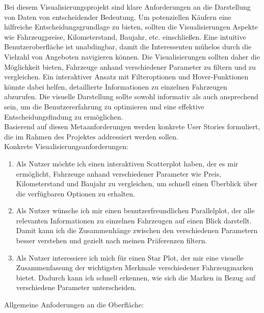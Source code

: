 \documentclass[usegeometry=true]{scrartcl}
\begin{document}
Bei diesem Visualisierungsprojekt sind klare Anforderungen an die Darstellung von Daten von entscheidender Bedeutung. Um potenziellen Käufern eine hilfreiche Entscheidungsgrundlage zu bieten, sollten die Visualisierungen Aspekte wie Fahrzeugpreise, Kilometerstand, Baujahr, etc. einschließen. Eine intuitive Benutzeroberfläche ist unabdingbar, damit die Interessenten mühelos durch die Vielzahl von Angeboten navigieren können. Die Visualisierungen sollten daher die Möglichkeit bieten, Fahrzeuge anhand verschiedener Parameter zu filtern und zu vergleichen. Ein interaktiver Ansatz mit Filteroptionen und Hover-Funktionen könnte dabei helfen, detaillierte Informationen zu einzelnen Fahrzeugen abzurufen. Die visuelle Darstellung sollte sowohl informativ als auch ansprechend sein, um die Benutzererfahrung zu optimieren und eine effektive Entscheidungsfindung zu ermöglichen.  \\
Basierend auf diesen Metaanforderungen werden konkrete User Stories formuliert, die im Rahmen des Projektes addressiert werden sollen. \\
Konkrete Visualisierungsanforderungen: \\
\begin{enumerate}

    \item Als Nutzer möchte ich einen interaktiven Scatterplot haben, der es mir ermöglicht, Fahrzeuge anhand verschiedener Parameter wie Preis, Kilometerstand und Baujahr zu vergleichen, um schnell einen Überblick über die verfügbaren Optionen zu erhalten.
    
    \item Als Nutzer wünsche ich mir einen benutzerfreundlichen Parallelplot, der alle relevanten Informationen zu einzelnen Fahrzeugen auf einen Blick darstellt. Damit kann ich die Zusammenhänge zwischen den verschiedenen Parametern besser verstehen und gezielt nach meinen Präferenzen filtern.
    
    \item Als Nutzer interessiere ich mich für einen Star Plot, der mir eine visuelle Zusammenfassung der wichtigsten Merkmale verschiedener Fahrzeugmarken bietet. Dadurch kann ich schnell erkennen, wie sich die Marken in Bezug auf verschiedene Parameter unterscheiden.
\end{enumerate}
Allgemeine Anfoderungen an die Oberfläche: \\
\end{document}
